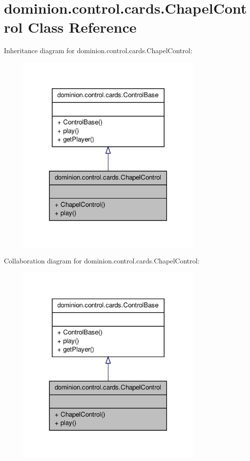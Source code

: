 \hypertarget{classdominion_1_1control_1_1cards_1_1ChapelControl}{\section{dominion.\-control.\-cards.\-Chapel\-Control \-Class \-Reference}
\label{classdominion_1_1control_1_1cards_1_1ChapelControl}
}


\-Inheritance diagram for dominion.\-control.\-cards.\-Chapel\-Control\-:
\nopagebreak
\begin{figure}[H]
\begin{center}
\leavevmode
\includegraphics[width=260pt]{classdominion_1_1control_1_1cards_1_1ChapelControl__inherit__graph}
\end{center}
\end{figure}


\-Collaboration diagram for dominion.\-control.\-cards.\-Chapel\-Control\-:
\nopagebreak
\begin{figure}[H]
\begin{center}
\leavevmode
\includegraphics[width=260pt]{classdominion_1_1control_1_1cards_1_1ChapelControl__coll__graph}
\end{center}
\end{figure}
